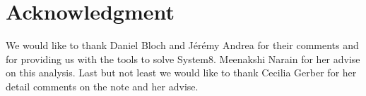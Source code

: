 

\maketitle %

 
\setcounter{page}{2}
 

\label{sec:intro}



\label{sec:taggingalgos}


\label{sec:distributions}


\label{sec:system8}



\label{sec:avg_results}

\label{sec:binned_results}


\label{sec:conclusions}

\section{Acknowledgment} 
We would like to thank Daniel Bloch and J\'er\'emy Andrea for their comments and for providing
us with the tools to solve System8. Meenakshi Narain for her advise on this analysis. Last but not
least we would like to thank Cecilia Gerber for her detail comments on the note and her
advise.

\appendix


